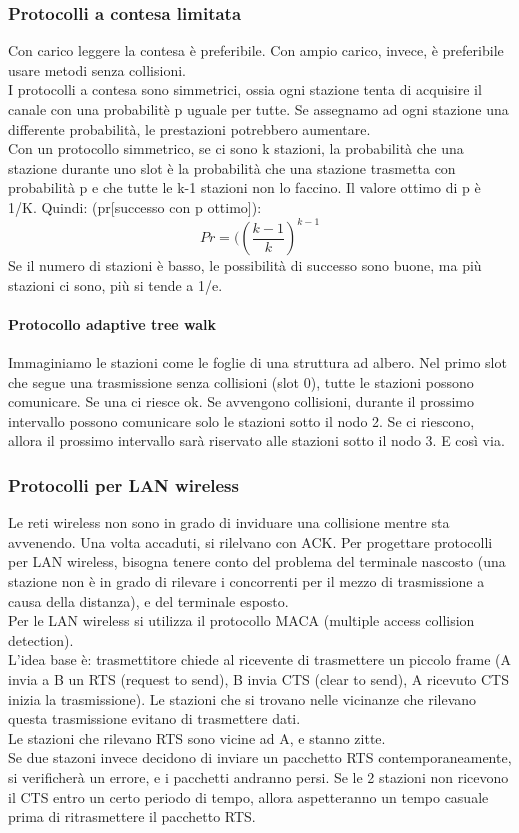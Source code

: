 \documentclass{article}
\begin{document}
\subsubsection{Protocolli a contesa limitata} 
Con carico leggere la contesa è preferibile. Con ampio carico, invece, è preferibile usare metodi senza collisioni.\\
I protocolli a contesa sono simmetrici, ossia ogni stazione tenta di acquisire il canale con una probabilitè p uguale per tutte. Se assegnamo ad ogni stazione una differente probabilità, le prestazioni potrebbero aumentare. \\
Con un protocollo simmetrico, se ci sono k stazioni, la probabilità che una stazione durante uno slot è la probabilità che una stazione trasmetta con probabilità p e che tutte le k-1 stazioni non lo faccino. Il valore ottimo di p è 1/K. Quindi: (pr[successo con p ottimo]):
\begin{equation}
Pr = ((\frac{k-1}{k})^{k-1}
\end{equation}
Se il numero di stazioni è basso, le possibilità di successo sono buone, ma più stazioni ci sono, più si tende a 1/e.
\paragraph{Protocollo adaptive tree walk}
Immaginiamo le stazioni come le foglie di una struttura ad albero. Nel primo slot che segue una trasmissione senza collisioni (slot 0), tutte le stazioni possono comunicare. Se una ci riesce ok. Se avvengono collisioni, durante il prossimo intervallo possono comunicare solo le stazioni sotto il nodo 2. Se ci riescono, allora il prossimo intervallo sarà riservato alle stazioni sotto il nodo 3. E così via.
\subsubsection{Protocolli per LAN wireless}
Le reti wireless non sono in grado di inviduare una collisione mentre sta avvenendo. Una volta accaduti, si rilelvano con ACK.
Per progettare protocolli per LAN wireless, bisogna tenere conto del problema del terminale nascosto (una stazione non è in grado di rilevare i concorrenti per il mezzo di trasmissione a causa della distanza), e del terminale esposto.\\
Per le LAN wireless si utilizza il protocollo MACA (multiple access collision detection).\\ L'idea base è: trasmettitore chiede al ricevente di trasmettere un piccolo frame (A invia a B un RTS (request to send), B invia CTS (clear to send), A ricevuto CTS inizia la trasmissione). Le stazioni che si trovano nelle vicinanze che rilevano questa trasmissione evitano di trasmettere dati. \\
Le stazioni che rilevano RTS sono vicine ad A, e stanno zitte. \\
Se due stazoni invece decidono di inviare un pacchetto RTS contemporaneamente, si verificherà un errore, e i pacchetti andranno persi. Se le 2 stazioni non ricevono il CTS entro un certo periodo di tempo, allora aspetteranno un tempo casuale prima di ritrasmettere il pacchetto RTS.
\end{document}
